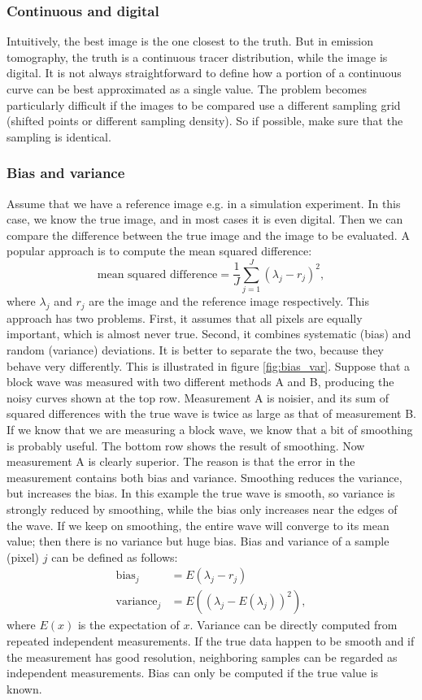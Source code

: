 \documentclass[11pt,oneside]{article}
\begin{document}
\subsubsection{Continuous and digital}
Intuitively, the best image is the one closest to the truth. But in emission
tomography, the truth is a continuous tracer distribution, while the image is
digital. It is not always straightforward to define how a portion of a
continuous curve can be best approximated as a single value. The problem
becomes particularly difficult if the images to be compared use a different
sampling grid (shifted points or different sampling density). So if possible,
make sure that the sampling is identical.

\subsubsection{Bias and variance}
Assume that we have a reference image e.g. in a simulation experiment. In
this case, we know the true image, and in most cases it is even digital. Then
we can compare the difference between the true image and the image to be
evaluated. A popular approach is to compute the mean squared difference:
\begin{equation}
  \mbox{mean squared difference} = \frac{1}{J} \sum_{j=1}^J (\lambda_j - r_j)^2,
\end{equation}
where $\lambda_j$ and $r_j$ are the image and the reference image
respectively.  This approach has two problems. First, it assumes that
all pixels are equally important, which is almost never true. Second,
it combines systematic (bias) and random (variance) deviations. It is
better to separate the two, because they behave very differently. This
is illustrated in figure \ref{fig:bias_var}. Suppose that a block wave
was measured with two different methods A and B, producing the noisy
curves shown at the top row. Measurement A is noisier, and its sum of
squared differences with the true wave is twice as large as that of
measurement B. If we know that we are measuring a block wave, we know
that a bit of smoothing is probably useful. The bottom row shows the
result of smoothing. Now measurement A is clearly superior. The reason
is that the error in the measurement contains both bias and
variance. Smoothing reduces the variance, but increases the bias. In
this example the true wave is smooth, so variance is strongly reduced
by smoothing, while the bias only increases near the edges of the
wave.  If we keep on smoothing, the entire wave will converge to its
mean value; then there is no variance but huge bias. Bias and variance
of a sample (pixel) $j$ can be defined as follows:
\begin{align}
  \mbox{bias}_j     &= E(\lambda_j - r_j)\\
  \mbox{variance}_j &= E\left((\lambda_j - E(\lambda_j))^2 \right),
\end{align}
where $E(x)$ is the expectation of $x$. Variance can be directly computed from
repeated independent measurements. If the true data happen to be smooth and if
the measurement has good resolution, neighboring samples can be regarded as
independent measurements. Bias can only be computed if the true value is known.
\end{document}
